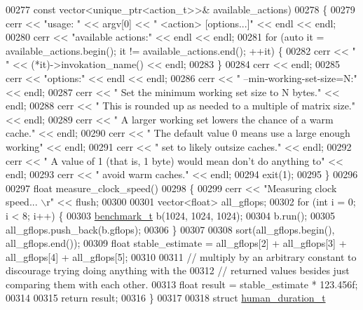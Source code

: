\begin{DoxyCode}
00277                          \textcolor{keyword}{const} vector<unique\_ptr<action\_t>>& available\_actions)
00278 \{
00279   cerr << \textcolor{stringliteral}{"usage: "} << argv[0] << \textcolor{stringliteral}{" <action> [options...]"} << endl << endl;
00280   cerr << \textcolor{stringliteral}{"available actions:"} << endl << endl;
00281   \textcolor{keywordflow}{for} (\textcolor{keyword}{auto} it = available\_actions.begin(); it != available\_actions.end(); ++it) \{
00282     cerr << \textcolor{stringliteral}{"  "} << (*it)->invokation\_name() << endl;
00283   \}
00284   cerr << endl;
00285   cerr << \textcolor{stringliteral}{"options:"} << endl << endl;
00286   cerr << \textcolor{stringliteral}{"  --min-working-set-size=N:"} << endl;
00287   cerr << \textcolor{stringliteral}{"       Set the minimum working set size to N bytes."} << endl;
00288   cerr << \textcolor{stringliteral}{"       This is rounded up as needed to a multiple of matrix size."} << endl;
00289   cerr << \textcolor{stringliteral}{"       A larger working set lowers the chance of a warm cache."} << endl;
00290   cerr << \textcolor{stringliteral}{"       The default value 0 means use a large enough working"} << endl;
00291   cerr << \textcolor{stringliteral}{"       set to likely outsize caches."} << endl;
00292   cerr << \textcolor{stringliteral}{"       A value of 1 (that is, 1 byte) would mean don't do anything to"} << endl;
00293   cerr << \textcolor{stringliteral}{"       avoid warm caches."} << endl;
00294   exit(1);
00295 \}
00296      
00297 \textcolor{keywordtype}{float} measure\_clock\_speed()
00298 \{
00299   cerr << \textcolor{stringliteral}{"Measuring clock speed...                              \(\backslash\)r"} << flush;
00300           
00301   vector<float> all\_gflops;
00302   \textcolor{keywordflow}{for} (\textcolor{keywordtype}{int} i = 0; i < 8; i++) \{
00303     \hyperlink{structbenchmark__t}{benchmark\_t} b(1024, 1024, 1024);
00304     b.run();
00305     all\_gflops.push\_back(b.gflops);
00306   \}
00307 
00308   sort(all\_gflops.begin(), all\_gflops.end());
00309   \textcolor{keywordtype}{float} stable\_estimate = all\_gflops[2] + all\_gflops[3] + all\_gflops[4] + all\_gflops[5];
00310 
00311   \textcolor{comment}{// multiply by an arbitrary constant to discourage trying doing anything with the}
00312   \textcolor{comment}{// returned values besides just comparing them with each other.}
00313   \textcolor{keywordtype}{float} result = stable\_estimate * 123.456f;
00314 
00315   \textcolor{keywordflow}{return} result;
00316 \}
00317 
00318 \textcolor{keyword}{struct }\hyperlink{structhuman__duration__t}{human\_duration\_t}

\end{DoxyCode}
